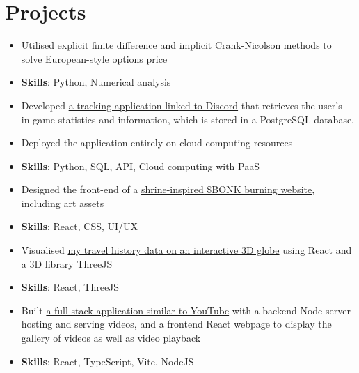 \documentclass{cv}
\begin{document}
\section{Projects}
\begin{subsections}
    \begin{itemize}
        \item \href{https://github.com/thedylone/black-scholes-numerical}{Utilised explicit finite difference and implicit Crank-Nicolson methods} to solve European-style options price
        \item \textbf{Skills}: Python, Numerical analysis
    \end{itemize}

    \begin{itemize}
        \item Developed \href{https://thedylone.github.io/laffey-bot/}{a tracking application linked to Discord} that retrieves the user's in-game statistics and information, which is stored in a PostgreSQL database.
        \item Deployed the application entirely on cloud computing resources
        \item \textbf{Skills}: Python, SQL, API, Cloud computing with PaaS
    \end{itemize}

    \begin{itemize}
        \item Designed the front-end of a \href{https://bonk-shrine.vercel.app/}{shrine-inspired \$BONK burning website}, including art assets
        \item \textbf{Skills}: React, CSS, UI/UX
    \end{itemize}

    \begin{itemize}
        \item Visualised \href{https://thedylone.github.io/travel-history/}{my travel history data on an interactive 3D globe} using React and a 3D library ThreeJS
        \item \textbf{Skills}: React, ThreeJS
    \end{itemize}

    \begin{itemize}
        \item Built \href{https://github.com/thedylone/node-video-player}{a full-stack application similar to YouTube} with a backend Node server hosting and serving videos, and a frontend React webpage to display the gallery of videos as well as video playback
        \item \textbf{Skills}: React, TypeScript, Vite, NodeJS
    \end{itemize}


\end{subsections}
\end{document}
